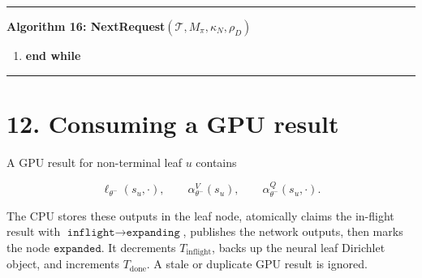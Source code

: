 \documentclass[11pt]{article}
\newcommand{\Tree}{\mathcal{T}}
\newcommand{\Path}{\mathcal{P}}
\newcommand{\Available}{\mathcal{A}_{\mathrm{avail}}}
\newcommand{\ThompsonSelect}{\operatorname{ThompsonSelect}}
\newcommand{\EvaluateReachedLeaf}{\operatorname{EvaluateReachedLeaf}}
\newcommand{\NoRequest}{\operatorname{NoRequest}}
\newcommand{\TryGetOrCreateChild}{\operatorname{TryGetOrCreateChild}}
\newcommand{\PropagateCategorical}{\operatorname{PropagateCategorical}}
\newenvironment{algorithmblock}[1]
{
  \par\medskip
  \noindent\hrule\par\smallskip
  \noindent\textbf{#1}
  \par\smallskip
}
{
  \par\smallskip\noindent\hrule\par\medskip
}
\newcommand{\Return}{\textbf{return }}
\newcommand{\If}{\textbf{if }}
\newcommand{\Then}{\textbf{ then }}
\newcommand{\EndIf}{\textbf{end if}}
\newcommand{\EndWhile}{\textbf{end while}}
\newcommand{\Continue}{\textbf{continue}}
\begin{document}
\begin{algorithmblock}{Algorithm 16: NextRequest\((\Tree,M_\pi,\kappa_N,\rho_D)\)}
\begin{enumerate}[leftmargin=2em]
\begin{enumerate}[leftmargin=2em]
    \item Select a Thompson action only from unresolved available actions:
    \[
    \tilde a
    \gets
    \ThompsonSelect(\Tree,v,\Available(v)).
    \]

    \item Append the edge to the path:
    \[
    \Path
    \gets
    \Path \mathbin{\Vert} ((v,\tilde a)).
    \]

    \item Get the unique child for this edge:
    \[
    u\gets\TryGetOrCreateChild(\Tree,v,\tilde a).
    \]

    \item \If \(s_u\) is terminal \Then
    \[
    \Return
    \EvaluateReachedLeaf(\Tree,u,\Path,M_\pi,\kappa_N,\rho_D).
    \]
    \EndIf

    \item \If \(\zeta_u\ne\bot\) \Then
    run
    \[
    \Tree\gets\PropagateCategorical(\Tree,u,\rho_D),
    \]
    and \Return \(\NoRequest\). \EndIf

    \item \If \(\sigma^{\mathrm{eval}}_u=\texttt{expanded}\) \Then
    \[
    v\gets u.
    \]
    \Continue.
    \EndIf

    \item Otherwise \(u\) is an unexpanded, in-flight, or expanding non-terminal
    leaf. Run
    \[
    \Return
    \EvaluateReachedLeaf(\Tree,u,\Path,M_\pi,\kappa_N,\rho_D).
    \]

  \end{enumerate}

  \item \EndWhile
\end{enumerate}

\end{algorithmblock}

\section*{12. Consuming a GPU result}

A GPU result for non-terminal leaf \(u\) contains

\[
\ell_{\theta^-}(s_u,\cdot),
\qquad
\alpha_{\theta^-}^V(s_u),
\qquad
\alpha_{\theta^-}^Q(s_u,\cdot).
\]

The CPU stores these outputs in the leaf node, atomically claims the in-flight
result with \(\texttt{inflight}\rightarrow\texttt{expanding}\), publishes the
network outputs, then marks the node \(\texttt{expanded}\). It decrements
\(T_{\mathrm{inflight}}\), backs up the neural leaf Dirichlet object, and
increments \(T_{\mathrm{done}}\). A stale or duplicate GPU result is ignored.
\end{document}
